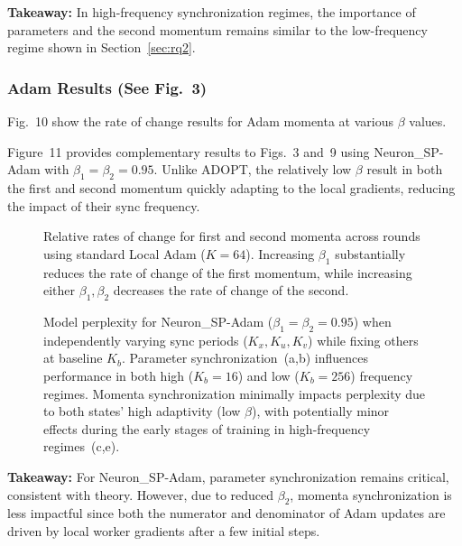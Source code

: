 \documentclass{article}
\begin{document}
\textbf{Takeaway:} In high-frequency synchronization regimes, the importance of parameters and the second momentum remains similar to the low-frequency regime shown in Section~\ref{sec:rq2}.

\subsubsection{Adam Results (See Fig.~3)}
\label{sec:b22_adam}

Fig.~10 show the rate of change results for Adam momenta at various $\beta$ values.

Figure~11 provides complementary results to Figs.~3 and~9 using Neuron\_SP-Adam with $\beta_1=\beta_2=0.95$. Unlike ADOPT, the relatively low $\beta$ result in both the first and second momentum quickly adapting to the local gradients, reducing the impact of their sync frequency.

\begin{figure}[ht]
\centering
\caption{Relative rates of change for first and second momenta across rounds using standard Local Adam ($K=64$). Increasing $\beta_1$ substantially reduces the rate of change of the first momentum, while increasing either $\beta_1, \beta_2$ decreases the rate of change of the second.}
\label{fig:10}
\end{figure}

\begin{figure}[ht]
\centering
\caption{Model perplexity for Neuron\_SP-Adam ($\beta_1=\beta_2=0.95$) when independently varying sync periods ($K_x, K_u, K_v$) while fixing others at baseline $K_b$. Parameter synchronization~(a,b) influences performance in both high ($K_b=16$) and low ($K_b=256$) frequency regimes. Momenta synchronization minimally impacts perplexity due to both states' high adaptivity (low $\beta$), with potentially minor effects during the early stages of training in high-frequency regimes~(c,e).}
\label{fig:11}
\end{figure}

\textbf{Takeaway:} For Neuron\_SP-Adam, parameter synchronization remains critical, consistent with theory. However, due to reduced $\beta_2$, momenta synchronization is less impactful since both the numerator and denominator of Adam updates are driven by local worker gradients after a few initial steps.
\end{document}
